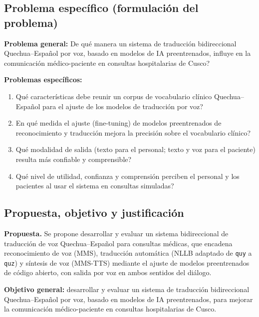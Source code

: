 \documentclass[12pt,a4paper]{article}
\begin{document}
\subsection{Problema espec{\'i}fico (formulaci{\'o}n del problema)}
\textbf{Problema general:} {\textquestiondown}De qu{\'e} manera un sistema de traducci{\'o}n
bidireccional Quechua--Espa{\~n}ol por voz, basado en modelos de IA preentrenados, influye en
la comunicaci{\'o}n m{\'e}dico-paciente en consultas hospitalarias de Cusco?

\textbf{Problemas espec{\'i}ficos:}
\begin{enumerate}
  \item {\textquestiondown}Qu{\'e} caracter{\'i}sticas debe reunir un corpus de vocabulario cl{\'i}nico Quechua--Espa{\~n}ol para el ajuste de los modelos de traducci{\'o}n por voz?
  \item {\textquestiondown}En qu{\'e} medida el ajuste (fine-tuning) de modelos preentrenados de reconocimiento y traducci{\'o}n mejora la precisi{\'o}n sobre el vocabulario cl{\'i}nico?
  \item {\textquestiondown}Qu{\'e} modalidad de salida (texto para el personal; texto y voz para el paciente) resulta m{\'a}s confiable y comprensible?
  \item {\textquestiondown}Qu{\'e} nivel de utilidad, confianza y comprensi{\'o}n perciben el personal y los pacientes al usar el sistema en consultas simuladas?
\end{enumerate}

\subsection{Propuesta, objetivo y justificaci{\'o}n}
\textbf{Propuesta.} Se propone desarrollar y evaluar un sistema bidireccional de traducci{\'o}n de
voz Quechua--Espa{\~n}ol para consultas m{\'e}dicas, que encadena reconocimiento de voz (MMS),
traducci{\'o}n autom{\'a}tica (NLLB adaptado de \texttt{quy} a \texttt{quz}) y s{\'i}ntesis de voz
(MMS-TTS) mediante el ajuste de modelos preentrenados de c{\'o}digo abierto, con salida por voz en
ambos sentidos del di{\'a}logo.

\textbf{Objetivo general:} desarrollar y evaluar un sistema de traducci{\'o}n bidireccional
Quechua--Espa{\~n}ol por voz, basado en modelos de IA preentrenados, para mejorar la
comunicaci{\'o}n m{\'e}dico-paciente en consultas hospitalarias de Cusco.
\end{document}
